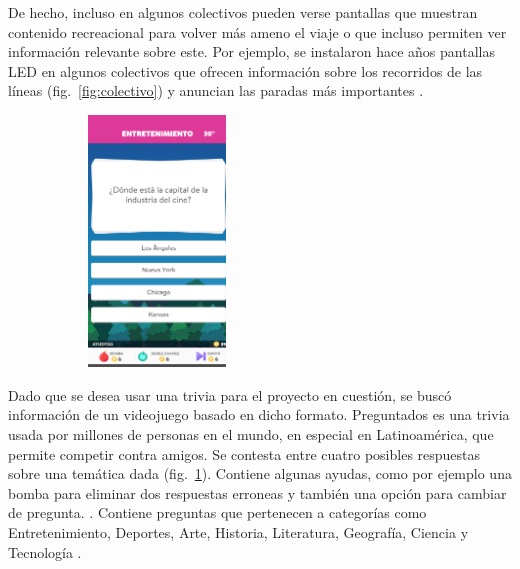\documentclass[twoside]{article}
\begin{document}
De hecho, incluso en algunos colectivos pueden verse pantallas que muestran contenido recreacional para volver más ameno el viaje o que incluso permiten ver información relevante sobre este. Por ejemplo, se instalaron hace años pantallas LED en algunos colectivos que ofrecen información sobre los recorridos de las líneas (fig.~\ref{fig:colectivo}) y anuncian las paradas más importantes \parencite{lacapitalColectivos}.
\begin{figure}[H]
	\caption{Preguntados}
    \begin{subfigure}{1.0\textwidth}
	\includegraphics[width=0.4\textwidth]{preguntados.png}
    \end{subfigure}
	\label{fig:preguntados}
\end{figure}
\vspace{-1.0\baselineskip}
Dado que se desea usar una trivia para el proyecto en cuestión, se buscó información de un videojuego basado en dicho formato. Preguntados es una trivia usada por millones de personas en el mundo, en especial en Latinoamérica, que permite competir contra amigos. Se contesta entre cuatro posibles respuestas sobre una temática dada (fig.~\ref{fig:preguntados}). Contiene algunas ayudas, como por ejemplo una bomba para eliminar dos respuestas erroneas y también una opción para cambiar de pregunta. \parencite{minutouno}. Contiene preguntas que pertenecen a categorías como Entretenimiento, Deportes, Arte, Historia, Literatura, Geografía, Ciencia y Tecnología \parencite{abcPreguntados}.
\end{document}
